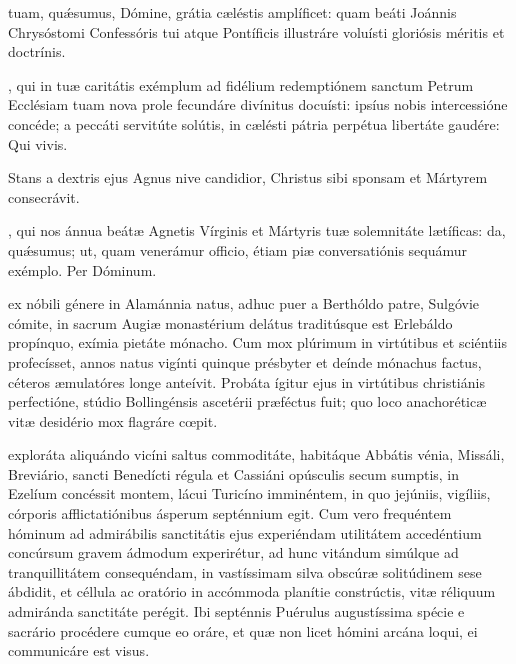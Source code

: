 \documentclass[fontsize=9pt,paper=A6,twoside,BCOR=1mm,DIV=22,headinclude]{scrarticle}
\renewcommand\A\Ant
\begin{document}
\begin{multicols}{2}
\VRCPiii

 tuam, quǽsumus, Dómine, grátia cæléstis amplíficet: quam beáti Joánnis Chrysóstomi Confessóris tui atque Pontíficis illustráre voluísti gloriósis méritis et doctrínis.


\AiC 

\VRCi 

, qui in tuæ caritátis exémplum ad fidélium redemptiónem sanctum Petrum Ecclésiam tuam nova prole fecundáre divínitus docuísti: ipsíus nobis intercessióne concéde; a peccáti servitúte solútis, in cælésti pátria perpétua libertáte gaudére: \red{(}Qui vivis.\red{)}


\A Stans a dextris ejus Agnus nive candidior, Christus sibi sponsam et Mártyrem consecrávit.

\VRVi 

, qui nos ánnua beátæ Agnetis Vírginis et Mártyris tuæ solemnitáte lætíficas: da, quǽsumus; ut, quam venerámur officio, étiam piæ conversatiónis sequámur exémplo. Per Dóminum.

 ex nóbili génere in Alamánnia natus, adhuc puer a Berthóldo patre, Sulgóvie cómite, in sacrum Augiæ monastérium delátus traditúsque est Erlebáldo propínquo, exímia pietáte mónacho. Cum mox plúrimum in virtútibus et sciéntiis profecísset, annos natus vigínti quinque présbyter et deínde mónachus factus, céteros æmulatóres longe anteívit. Probáta ígitur ejus in virtútibus christiánis perfectióne, stúdio Bollingénsis ascetérii præféctus fuit; quo loco anachoréticæ vitæ desidério mox flagráre cœpit.

\RVCiv 

 exploráta aliquándo vicíni saltus commoditáte, habitáque Abbátis vénia, Missáli, Breviário, sancti Benedícti régula et Cassiáni opúsculis secum sumptis, in Ezelíum concéssit montem, lácui Turicíno imminéntem, in quo jejúniis, vigíliis, córporis afflictatiónibus ásperum septénnium egit. Cum vero frequéntem hóminum ad admirábilis sanctitátis ejus experiéndam utilitátem accedéntium concúrsum gravem ádmodum experirétur, ad hunc vitándum simúlque ad tranquillitátem consequéndam, in vastíssimam silva obscúræ solitúdinem sese ábdidit, et céllula ac oratório in accómmoda planítie constrúctis, vitæ réliquum admiránda sanctitáte perégit. Ibi septénnis Puérulus augustíssima spécie e sacrário procédere cumque eo oráre, et quæ non licet hómini arcána loqui, ei communicáre est visus.


\end{multicols}
\end{document}
